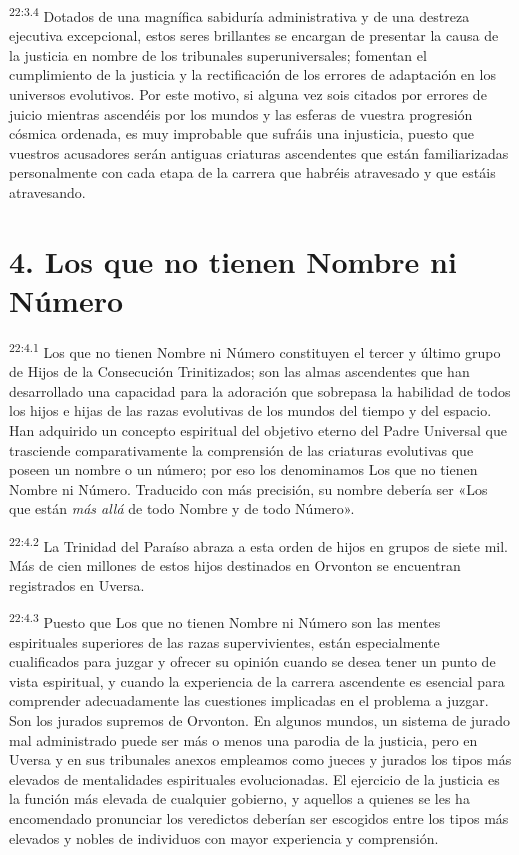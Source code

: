 \par
\textsuperscript{22:3.4} Dotados de una magnífica sabiduría administrativa y de una destreza ejecutiva excepcional, estos seres brillantes se encargan de presentar la causa de la justicia en nombre de los tribunales superuniversales; fomentan el cumplimiento de la justicia y la rectificación de los errores de adaptación en los universos evolutivos. Por este motivo, si alguna vez sois citados por errores de juicio mientras ascendéis por los mundos y las esferas de vuestra progresión cósmica ordenada, es muy improbable que sufráis una injusticia, puesto que vuestros acusadores serán antiguas criaturas ascendentes que están familiarizadas personalmente con cada etapa de la carrera que habréis atravesado y que estáis atravesando.

\section*{4. Los que no tienen Nombre ni Número}
\par
\textsuperscript{22:4.1} Los que no tienen Nombre ni Número constituyen el tercer y último grupo de Hijos de la Consecución Trinitizados; son las almas ascendentes que han desarrollado una capacidad para la adoración que sobrepasa la habilidad de todos los hijos e hijas de las razas evolutivas de los mundos del tiempo y del espacio. Han adquirido un concepto espiritual del objetivo eterno del Padre Universal que trasciende comparativamente la comprensión de las criaturas evolutivas que poseen un nombre o un número; por eso los denominamos Los que no tienen Nombre ni Número. Traducido con más precisión, su nombre debería ser «Los que están \textit{más allá} de todo Nombre y de todo Número».

\par
\textsuperscript{22:4.2} La Trinidad del Paraíso abraza a esta orden de hijos en grupos de siete mil. Más de cien millones de estos hijos destinados en Orvonton se encuentran registrados en Uversa.

\par
\textsuperscript{22:4.3} Puesto que Los que no tienen Nombre ni Número son las mentes espirituales superiores de las razas supervivientes, están especialmente cualificados para juzgar y ofrecer su opinión cuando se desea tener un punto de vista espiritual, y cuando la experiencia de la carrera ascendente es esencial para comprender adecuadamente las cuestiones implicadas en el problema a juzgar. Son los jurados supremos de Orvonton. En algunos mundos, un sistema de jurado mal administrado puede ser más o menos una parodia de la justicia, pero en Uversa y en sus tribunales anexos empleamos como jueces y jurados los tipos más elevados de mentalidades espirituales evolucionadas. El ejercicio de la justicia es la función más elevada de cualquier gobierno, y aquellos a quienes se les ha encomendado pronunciar los veredictos deberían ser escogidos entre los tipos más elevados y nobles de individuos con mayor experiencia y comprensión.

